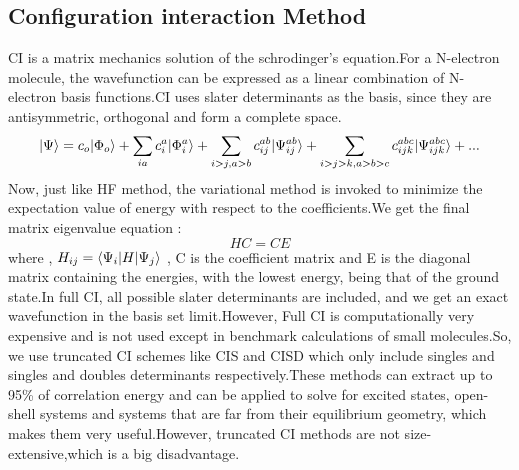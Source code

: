 \subsection{Configuration interaction Method}
CI is a matrix mechanics solution of the schrodinger's equation.For a
N-electron molecule, the wavefunction can be expressed as a linear combination
of N-electron basis functions.CI uses slater determinants as the basis, since
they are antisymmetric, orthogonal and  form a complete space.  \begin{equation}
| \Psi \rangle = c_o| \Phi_o \rangle + \sum_{ia}{c}_{i}^{a}| {\Phi}^a_i \rangle + \sum_{i>j,a>b}c_{ij}^{ab}| \Psi^{ab}_{ij} \rangle + \sum_{i>j>k,a>b>c}c_{ijk}^{abc}| \Psi^{abc}_{ijk} \rangle + ...
\end{equation}
 Now, just like HF method, the variational method is invoked to minimize the
expectation value of energy with respect to the coefficients.We get the final
matrix eigenvalue equation : \begin{equation}
HC = CE
\end{equation}
where , $H_{ij} = \langle \Psi_i |H| \Psi_j \rangle$ , C is the coefficient matrix and
E is the diagonal matrix containing the energies, with the lowest energy, being
that of the ground state.In full CI, all possible slater determinants are
included, and we get an exact wavefunction in the basis set limit.However, Full
CI is computationally very expensive and is not used except in benchmark
calculations of small molecules.So, we use truncated CI schemes like CIS and
CISD which only include singles and singles and doubles determinants
respectively.These methods can extract up to 95\% of correlation energy\cite{HarrisonHandy83} and
can be applied to solve for excited states, open-shell systems and systems that
are far from their equilibrium geometry, which makes them very useful.However,
truncated CI methods are not size-extensive,which is a big disadvantage.

